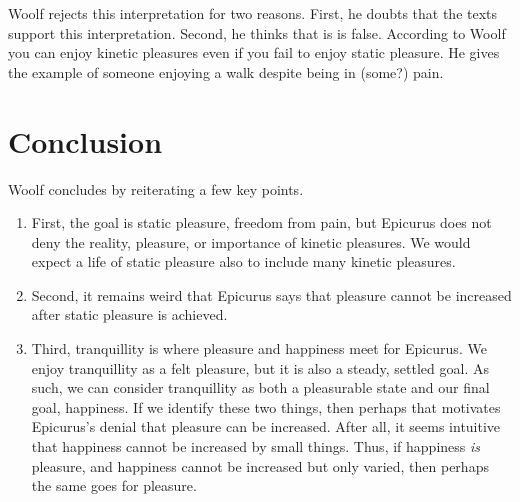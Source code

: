 \documentclass[12pt,letterpaper]{article}
\begin{document}
Woolf rejects this interpretation for two reasons.
First, he doubts that the texts support this interpretation.
Second, he thinks that is is false.
According to Woolf you can enjoy kinetic pleasures even if you fail to enjoy static pleasure.
He gives the example of someone enjoying a walk despite being in (some?) pain.

\section*{Conclusion}

Woolf concludes by reiterating a few key points.

\begin{enumerate}
    \item First, the goal is static pleasure, freedom from pain, but Epicurus does not deny the reality, pleasure, or importance of kinetic pleasures.
    We would expect a life of static pleasure also to include many kinetic pleasures.
    \item Second, it remains weird that Epicurus says that pleasure cannot be increased after static pleasure is achieved.
    \item Third, tranquillity is where pleasure and happiness meet for Epicurus.
    We enjoy tranquillity as a felt pleasure, but it is also a steady, settled goal.
    As such, we can consider tranquillity as both a pleasurable state and our final goal, happiness.
    If we identify these two things, then perhaps that motivates Epicurus's denial that pleasure can be increased.
    After all, it seems intuitive that happiness cannot be increased by small things.
    Thus, if happiness \textit{is} pleasure, and happiness cannot be increased but only varied, then perhaps the same goes for pleasure.
\end{enumerate}

\newpage\
\pagestyle{references}
\printbibliography[title={Bibliography}]
\end{document}
